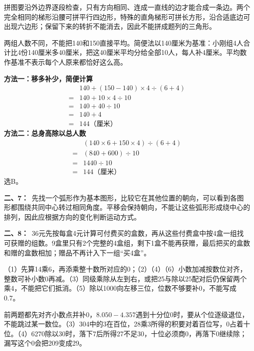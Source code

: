 \documentclass[multi=snippet,border=0pt]{standalone}
\newenvironment{snippet}[3]{\begin{minipage}{#1bp}\color{answerred}\fontsize{#2}{#3}\selectfont\raggedright}{\end{minipage}}
\begin{document}
\begin{snippet}{505}{11.5}{14}拼图要沿外边界逐段检查，只有方向相同、连成一直线的边才能合成一条边。两个完全相同的梯形沿腰可拼平行四边形，特殊的直角梯形可拼长方形，沿合适底边可出现六边形；保留下来的转折不能消去，因此不能拼成题列的三角形。\end{snippet}
\begin{snippet}{505}{11.5}{14}两组人数不同，不能把140和150直接平均。简便法以140厘米为基准：小刚组4人合计比4份140厘米多40厘米，把这40厘米平均分给全部10人，每人补4厘米。平均数作基准不表示每个人原来都恰好这么高。\par \textbf{方法一：移多补少，简便计算}\[\begin{aligned}&140+(150-140)\times4\div(6+4)\\={}&140+10\times4\div10\\={}&140+40\div10\\={}&140+4\\={}&144\text{（厘米）}\end{aligned}\]\textbf{方法二：总身高除以总人数}\[\begin{aligned}&(140\times6+150\times4)\div(6+4)\\={}&(840+600)\div10\\={}&1440\div10\\={}&144\text{（厘米）}\end{aligned}\]选B。\end{snippet}
\begin{snippet}{505}{11.5}{14}\textbf{二、7：}\ 先找一个弧形作为基本图形，比较它在其他位置的朝向，可以看到各图形都围绕共同中心转过相同角度。平移会保持朝向，不能让这些弧形形成绕中心的排列，因此应根据方向的变化判断运动方式。\end{snippet}
\begin{snippet}{505}{11.5}{14}\textbf{二、8：}\ 36元先按每盒4元计算可付费买的盒数，再从这些付费盒中按4盒一组找可获赠的组数。9盒里只有2个完整的4盒组，剩下1盒不能再获赠，最后把买的盒数和赠的盒数相加；赠品不再计入下一组“买4盒”。\end{snippet}
\begin{snippet}{505}{11.5}{14}（1）先算14乘6，再添乘整十数所对应的0；（2）（4）（6）小数加减按数位对齐，整数可补小数0再减。（3）同级乘除从左到右，或把25与除以25配对后仍保留两个乘4，不能把它们抵消。（5）除以1000向左移三位，位数不够要补0，不能写成0.7。\end{snippet}
\begin{snippet}{505}{11.5}{14}前两题都先对齐小数点并补0，\(8.050-4.357\)遇到十分位0时，要从个位逐级退位，不能跳过某一数位。（3）304中的3在百位，28乘3所得的积要对着百位写，0占着十位。（4）6270除以30时，落下7后所得27不足30，十位必须商0，再落下0继续除；漏写这个0会把209变成29。\end{snippet}
\end{document}
